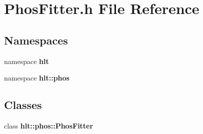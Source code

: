 \section{Phos\-Fitter.h File Reference}
\label{PhosFitter_8h}
\subsection*{Namespaces}
\begin{CompactItemize}
\item 
namespace {\bf hlt}
\item 
namespace {\bf hlt::phos}
\end{CompactItemize}
\subsection*{Classes}
\begin{CompactItemize}
\item 
class {\bf hlt::phos::Phos\-Fitter}
\end{CompactItemize}
